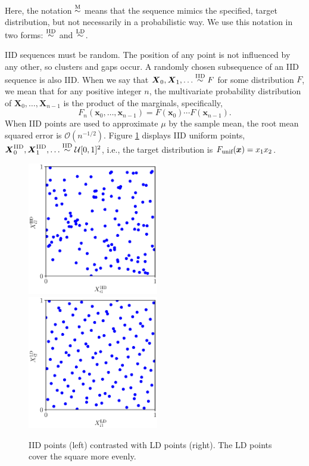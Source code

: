 \documentclass[graybox]{svmult}
\begin{document}
Here, the notation $\overset{\textup{M}}{\sim}$ means that the sequence mimics the specified, target distribution, but not necessarily in a probabilistic way.  We  use this notation in two forms:  $\overset{\textup{IID}}{\sim}$ and $\overset{\textup{LD}}{\sim}$.

IID sequences must be random. The position of any point is not influenced by any other, so clusters and gaps occur.  A randomly chosen subsequence of an IID sequence is also IID.  When we say that $\boldsymbol{X}_0, \boldsymbol{X}_1, \ldots \overset{\textup{IID}}{\sim} F$ for some distribution $F$, we mean that for any positive integer $n$, the  multivariate probability distribution of $\boldsymbol{X}_0, \ldots, \boldsymbol{X}_{n-1}$ is the product of the marginals, specifically,
\begin{equation*}
	F_{n}(\boldsymbol{x}_0, \ldots, \boldsymbol{x}_{n-1}) = F(\boldsymbol{x}_0) \cdots  F(\boldsymbol{x}_{n-1}).
\end{equation*}
When IID points are used to approximate $\mu$ by the sample mean, the root mean squared error is $\mathcal{O}(n^{-1/2})$.  Figure \ref{fig:comparePts} displays IID uniform points, $\boldsymbol{X}^{\textup{IID}}_0, \boldsymbol{X}^{\textup{IID}}_1, \ldots \overset{\textup{IID}}{\sim} \mathcal{U}[0,1]^2$, i.e.,  the target distribution is $F_{\textup{unif}}(\boldsymbol{x}) = x_1 x_2$.


\begin{figure}[t]
	\includegraphics[height=5.8cm]{QMCSoftwareArticle/vfigs/dd_iid_uniform_pts.eps}
	\quad
	\includegraphics[height=5.8cm]{QMCSoftwareArticle/vfigs/dd_sobol_pts.eps}
	\caption{IID points (left) contrasted with LD points (right).  The LD points cover the square more evenly.}
	\label{fig:comparePts}
\end{figure}
\end{document}
